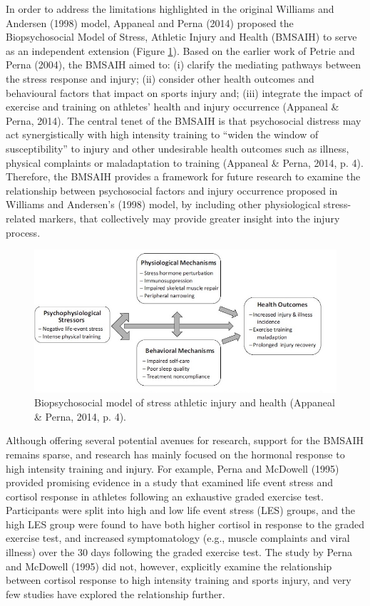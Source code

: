 \documentclass[man,floatsintext]{apa6}
\begin{document}
In order to address the limitations highlighted in the original Williams and Andersen (1998) model, Appaneal and Perna (2014)
proposed the Biopsychosocial Model of Stress, Athletic Injury and Health (BMSAIH) to serve as an independent extension (Figure \ref{fig:pernamodel}).
Based on the earlier work of Petrie and Perna (2004), the BMSAIH aimed to:
(i) clarify the mediating pathways between the stress response and injury;
(ii) consider other health outcomes and behavioural factors that impact on sports injury and;
(iii) integrate the impact of exercise and training on athletes' health and injury occurrence (Appaneal \& Perna, 2014).
The central tenet of the BMSAIH is that psychosocial distress may act synergistically with high intensity training to \enquote{widen the window of susceptibility} to injury and other undesirable health outcomes such as illness, physical complaints or maladaptation to training (Appaneal \& Perna, 2014, p. 4).
Therefore, the BMSAIH provides a framework for future research to examine the relationship between psychosocial factors and injury occurrence proposed in Williams and Andersen's (1998) model, by including other physiological stress-related markers, that collectively may provide greater insight into the injury process.

\begin{figure}

{\centering \includegraphics[width=1\linewidth]{figs/lit/bmoi} 

}

\caption{Biopsychosocial model of stress athletic injury and health (Appaneal \& Perna, 2014, p. 4).}\label{fig:pernamodel}
\end{figure}

Although offering several potential avenues for research, support for the BMSAIH remains sparse, and research has mainly focused on the hormonal response to high intensity training and injury.
For example, Perna and McDowell (1995) provided promising evidence in a study that examined life event stress and cortisol response in athletes following an exhaustive graded exercise test.
Participants were split into high and low life event stress (LES) groups, and the high LES group were found to have both higher cortisol in response to the graded exercise test, and increased symptomatology (e.g., muscle complaints and viral illness) over the 30 days following the graded exercise test.
The study by Perna and McDowell (1995) did not, however, explicitly examine the relationship between cortisol response to high intensity training and sports injury, and very few studies have explored the relationship further.
\end{document}
